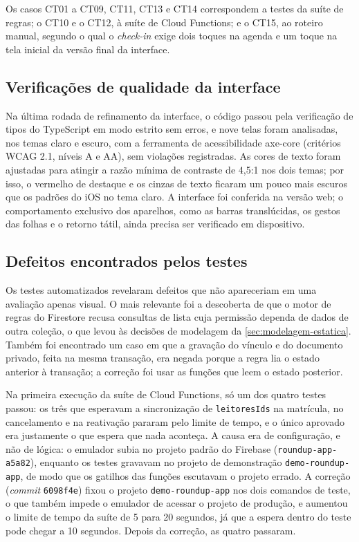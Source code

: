 Os casos CT01 a CT09, CT11, CT13 e CT14 correspondem a testes da suíte
de regras; o CT10 e o CT12, à suíte de Cloud Functions; e o CT15, ao
roteiro manual, segundo o
qual o \textit{check-in} exige dois toques na agenda e um toque na tela
inicial da versão final da interface.

\subsection{Verificações de qualidade da interface}

Na última rodada de refinamento da interface, o código passou pela
verificação de tipos do TypeScript em modo estrito sem erros, e nove
telas foram analisadas, nos temas claro e escuro, com a ferramenta de
acessibilidade axe-core (critérios WCAG 2.1, níveis A e AA), sem violações
registradas. As cores de texto foram ajustadas para atingir a razão
mínima de contraste de 4,5:1 nos dois temas; por isso, o vermelho de
destaque e os cinzas de texto ficaram um pouco mais escuros que os
padrões do iOS no tema claro. A interface foi conferida na versão web; o
comportamento exclusivo dos aparelhos, como as barras translúcidas, os
gestos das folhas e o retorno tátil, ainda precisa ser verificado em
dispositivo.

\subsection{Defeitos encontrados pelos testes}
\label{sec:defeitos-testes}

Os testes automatizados revelaram defeitos que não apareceriam em uma
avaliação apenas visual. O mais relevante foi a descoberta de que o
motor de regras do Firestore recusa consultas de lista cuja permissão
dependa de dados de outra coleção, o que levou às decisões de modelagem
da \autoref{sec:modelagem-estatica}. Também foi encontrado um caso em que
a gravação do vínculo e do documento privado, feita na mesma transação,
era negada porque a regra lia o estado anterior à transação; a correção
foi usar as funções que leem o estado posterior.

Na primeira execução da suíte de Cloud Functions, só um dos quatro testes
passou: os três que esperavam a sincronização de \texttt{leitoresIds} na
matrícula, no cancelamento e na reativação pararam pelo limite de tempo,
e o único aprovado era justamente o que espera que nada aconteça. A causa
era de configuração, e não de lógica: o emulador subia no projeto
padrão do Firebase (\texttt{roundup-app-a5a82}), enquanto os testes
gravavam no projeto de demonstração \texttt{demo-roundup-app}, de modo
que os gatilhos das funções escutavam o projeto errado. A correção
(\textit{commit} \texttt{6098f4e}) fixou o projeto
\texttt{demo-roundup-app} nos dois comandos de teste, o que também impede
o emulador de acessar o projeto de produção, e aumentou o limite de tempo
da suíte de 5 para 20 segundos, já que a espera dentro do teste pode
chegar a 10 segundos. Depois da correção, as quatro passaram.

